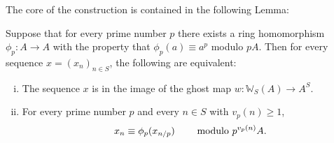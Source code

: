 The core of the construction is contained in the following Lemma:
\begin{lemma}[Dwork]\label{lem: dwork}
Suppose that for every prime number
$p$ there exists a ring homomorphism $\phi_p \colon A \to A$ with
the property that $\phi_p(a) \equiv a^p$ modulo $pA$. Then for every
sequence $x = (x_n)_{n \in S}$, the following 
are equivalent:
\begin{enumerate}[(i)]
\item The sequence $x$ is in the image of the ghost map
$w \colon \mathbb{W}_S(A) \to A^S.$
\item For every prime number $p$ and every $n \in S$
with $v_p(n) \geqslant 1$,
$$x_n \equiv \phi_p(x_{n/p}) \hskip8mm \text{modulo $p^{v_p(n)}A$.}$$
\end{enumerate}    
\end{lemma}
